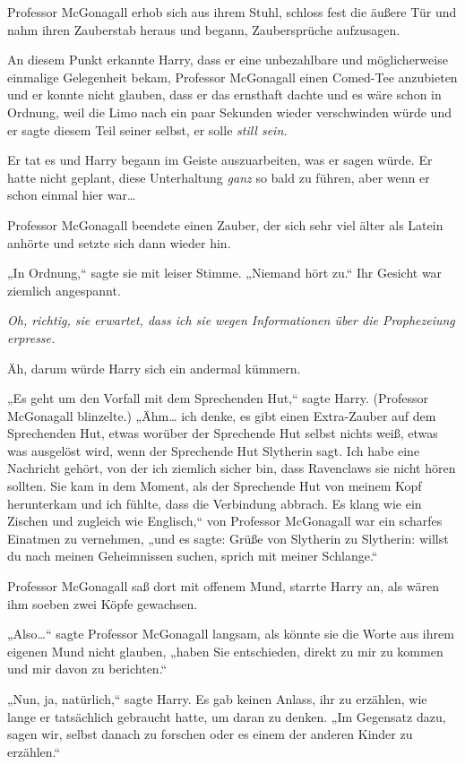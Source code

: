 {Professor McGonagall erhob sich aus ihrem Stuhl, schloss fest die äußere Tür und nahm ihren Zauberstab heraus und begann, Zaubersprüche aufzusagen.

An diesem Punkt erkannte Harry, dass er eine unbezahlbare und möglicherweise einmalige Gelegenheit bekam, Professor McGonagall einen Comed-Tee anzubieten und er konnte nicht glauben, dass er das ernsthaft dachte und es wäre schon in Ordnung, weil die Limo nach ein paar Sekunden wieder verschwinden würde und er sagte diesem Teil seiner selbst, er solle \emph{still sein.}

Er tat es und Harry begann im Geiste auszuarbeiten, was er sagen würde. Er hatte nicht geplant, diese Unterhaltung \emph{ganz} so bald zu führen, aber wenn er schon einmal hier war…

Professor McGonagall beendete einen Zauber, der sich sehr viel älter als Latein anhörte und setzte sich dann wieder hin.

„In Ordnung,“ sagte sie mit leiser Stimme. „Niemand hört zu.“ Ihr Gesicht war ziemlich angespannt.

\emph{Oh, richtig, sie erwartet, dass ich sie wegen Informationen über die Prophezeiung erpresse.}

Äh, darum würde Harry sich ein andermal kümmern.

„Es geht um den Vorfall mit dem Sprechenden Hut,“ sagte Harry. (Professor McGonagall blinzelte.) „Ähm… ich denke, es gibt einen Extra-Zauber auf dem Sprechenden Hut, etwas worüber der Sprechende Hut selbst nichts weiß, etwas was ausgelöst wird, wenn der Sprechende Hut Slytherin sagt. Ich habe eine Nachricht gehört, von der ich ziemlich sicher bin, dass Ravenclaws sie nicht hören sollten. Sie kam in dem Moment, als der Sprechende Hut von meinem Kopf herunterkam und ich fühlte, dass die Verbindung abbrach. Es klang wie ein Zischen und zugleich wie Englisch,“ von Professor McGonagall war ein scharfes Einatmen zu vernehmen, „und es sagte: Grüße von Slytherin zu Slytherin: willst du nach meinen Geheimnissen suchen, sprich mit meiner Schlange.“

Professor McGonagall saß dort mit offenem Mund, starrte Harry an, als wären ihm soeben zwei Köpfe gewachsen.

„Also…“ sagte Professor McGonagall langsam, als könnte sie die Worte aus ihrem eigenen Mund nicht glauben, „haben Sie entschieden, direkt zu mir zu kommen und mir davon zu berichten.“

„Nun, ja, natürlich,“ sagte Harry. Es gab keinen Anlass, ihr zu erzählen, wie lange er tatsächlich gebraucht hatte, um daran zu denken. „Im Gegensatz dazu, sagen wir, selbst danach zu forschen oder es einem der anderen Kinder zu erzählen.“

}
